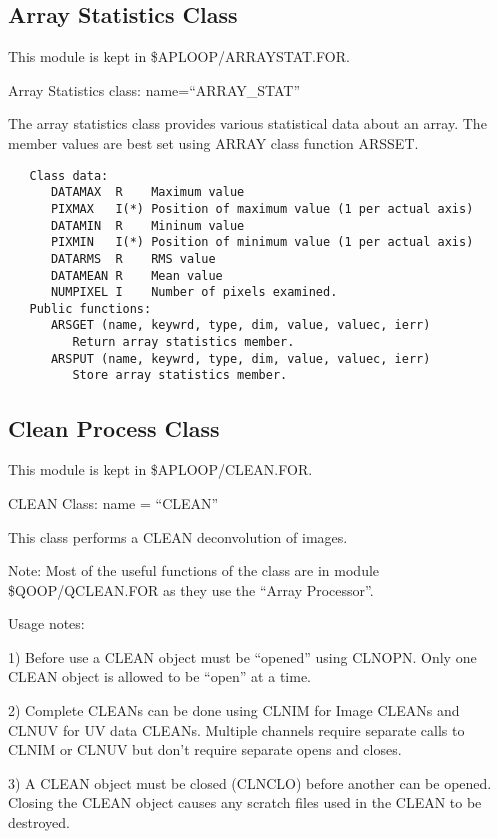 \subsection{Array Statistics Class}

   This module is kept in \$APLOOP/ARRAYSTAT.FOR.

   Array Statistics class: name=``ARRAY\_STAT''

   The array statistics class provides various statistical data about
an array.  The member values are best set using ARRAY class function
ARSSET.
{\small\begin{verbatim}
   Class data:
      DATAMAX  R    Maximum value
      PIXMAX   I(*) Position of maximum value (1 per actual axis)
      DATAMIN  R    Mininum value
      PIXMIN   I(*) Position of minimum value (1 per actual axis)
      DATARMS  R    RMS value
      DATAMEAN R    Mean value
      NUMPIXEL I    Number of pixels examined.
   Public functions:
      ARSGET (name, keywrd, type, dim, value, valuec, ierr)
         Return array statistics member.
      ARSPUT (name, keywrd, type, dim, value, valuec, ierr)
         Store array statistics member.
\end{verbatim}}

\subsection{Clean Process Class}

   This module is kept in \$APLOOP/CLEAN.FOR.

   CLEAN Class:  name = ``CLEAN''

   This class performs a CLEAN deconvolution of images.

    Note: Most of the useful functions of the class are in module
\$QOOP/QCLEAN.FOR as they  use the ``Array Processor''.

    Usage notes:

 1) Before use a CLEAN object must be ``opened'' using CLNOPN.  Only
 one CLEAN object is allowed to be ``open'' at a time.

 2) Complete CLEANs can be done using CLNIM for Image CLEANs and
 CLNUV for UV data CLEANs.  Multiple channels require separate calls
 to CLNIM or CLNUV but don't require separate opens and closes.

 3) A CLEAN object must be closed (CLNCLO) before another can be
 opened. Closing the CLEAN object causes any scratch files used in
 the CLEAN to be destroyed.

